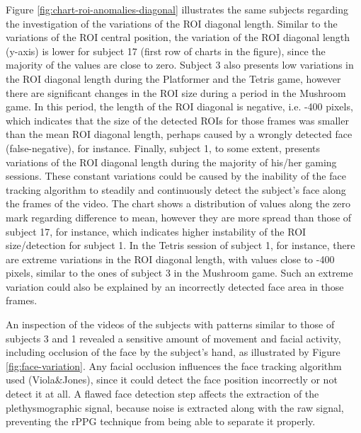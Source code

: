 Figure \ref{fig:chart-roi-anomalies-diagonal} illustrates the same subjects regarding the investigation of the variations of the ROI diagonal length. Similar to the variations of the ROI central position, the variation of the ROI diagonal length (y-axis) is lower for subject 17 (first row of charts in the figure), since the majority of the values are close to zero. Subject 3 also presents low variations in the ROI diagonal length during the Platformer and the Tetris game, however there are significant changes in the ROI size during a period in the Mushroom game. In this period, the length of the ROI diagonal is negative, i.e. -400 pixels, which indicates that the size of the detected ROIs for those frames was smaller than the mean ROI diagonal length, perhaps caused by a wrongly detected face (false-negative), for instance. Finally, subject 1, to some extent, presents variations of the ROI diagonal length during the majority of his/her gaming sessions. These constant variations could be caused by the inability of the face tracking algorithm to steadily and continuously detect the subject's face along the frames of the video. The chart shows a distribution of values along the zero mark regarding difference to mean, however they are more spread than those of subject 17, for instance, which indicates higher instability of the ROI size/detection for subject 1. In the Tetris session of subject 1, for instance, there are extreme variations in the ROI diagonal length, with values close to -400 pixels, similar to the ones of subject 3 in the Mushroom game. Such an extreme variation could also be explained by an incorrectly detected face area in those frames.

An inspection of the videos of the subjects with patterns similar to those of subjects 3 and 1 revealed a sensitive amount of movement and facial activity, including occlusion of the face by the subject's hand, as illustrated by Figure \ref{fig:face-variation}. Any facial occlusion influences the face tracking algorithm used (Viola\&Jones), since it could detect the face position incorrectly or not detect it at all. A flawed face detection step affects the extraction of the plethysmographic signal, because noise is extracted along with the raw signal, preventing the rPPG technique from being able to separate it properly.

